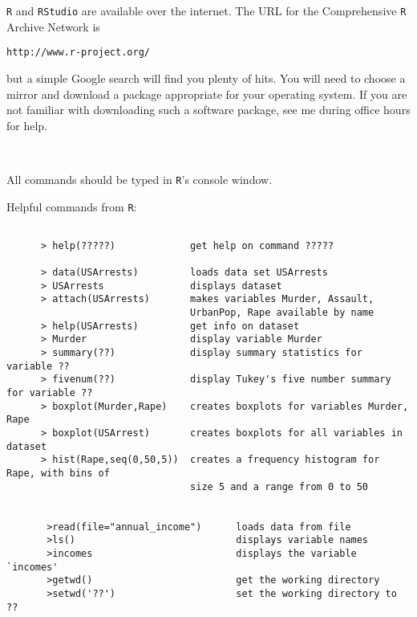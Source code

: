 \documentclass{report}
\begin{document}
 \newpage

{\tt R} and {\tt RStudio} are available over the internet.  The URL for the Comprehensive {\tt R}
Archive Network is

\centerline{\tt http://www.r-project.org/}

\noindent but a simple Google search will find you plenty of hits.
You will need to choose a mirror and download a
package appropriate for your operating system.  If you are not
familiar with downloading such a software package, see me during
office hours for help.

\

\noindent All commands should be typed in {\tt R}'s console window.

\smallskip

Helpful commands from {\tt R}:

\begin{verbatim}

      > help(?????)             get help on command ?????

      > data(USArrests)         loads data set USArrests
      > USArrests               displays dataset
      > attach(USArrests)       makes variables Murder, Assault,
                                UrbanPop, Rape available by name
      > help(USArrests)         get info on dataset
      > Murder                  display variable Murder
      > summary(??)             display summary statistics for variable ??
      > fivenum(??)             display Tukey's five number summary for variable ??
      > boxplot(Murder,Rape)    creates boxplots for variables Murder, Rape
      > boxplot(USArrest)       creates boxplots for all variables in dataset
      > hist(Rape,seq(0,50,5))  creates a frequency histogram for Rape, with bins of
                                size 5 and a range from 0 to 50
                                
                                
       >read(file="annual_income")      loads data from file
       >ls()                            displays variable names
       >incomes                         displays the variable `incomes'
       >getwd()                         get the working directory
       >setwd('??')                     set the working directory to ??
\end{verbatim}
\end{document}
